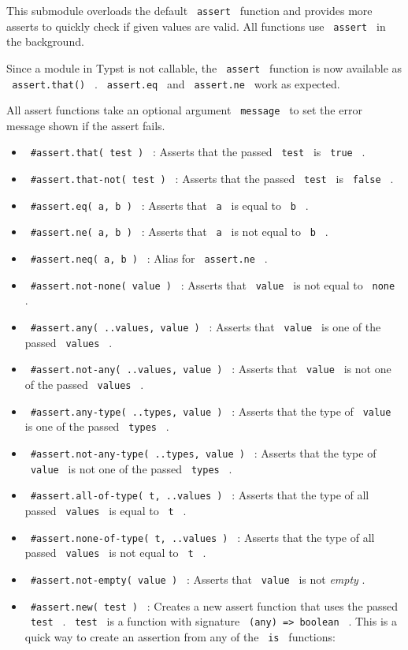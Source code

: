 This submodule overloads the default \texttt{\ assert\ } function and
provides more asserts to quickly check if given values are valid. All
functions use \texttt{\ assert\ } in the background.

Since a module in Typst is not callable, the \texttt{\ assert\ }
function is now available as \texttt{\ assert.that()\ } .
\texttt{\ assert.eq\ } and \texttt{\ assert.ne\ } work as expected.

All assert functions take an optional argument \texttt{\ message\ } to
set the error message shown if the assert fails.

\begin{itemize}
\item
  \texttt{\ \#assert.that(\ test\ )\ } : Asserts that the passed
  \texttt{\ test\ } is \texttt{\ true\ } .
\item
  \texttt{\ \#assert.that-not(\ test\ )\ } : Asserts that the passed
  \texttt{\ test\ } is \texttt{\ false\ } .
\item
  \texttt{\ \#assert.eq(\ a,\ b\ )\ } : Asserts that \texttt{\ a\ } is
  equal to \texttt{\ b\ } .
\item
  \texttt{\ \#assert.ne(\ a,\ b\ )\ } : Asserts that \texttt{\ a\ } is
  not equal to \texttt{\ b\ } .
\item
  \texttt{\ \#assert.neq(\ a,\ b\ )\ } : Alias for
  \texttt{\ assert.ne\ } .
\item
  \texttt{\ \#assert.not-none(\ value\ )\ } : Asserts that
  \texttt{\ value\ } is not equal to \texttt{\ none\ } .
\item
  \texttt{\ \#assert.any(\ ..values,\ value\ )\ } : Asserts that
  \texttt{\ value\ } is one of the passed \texttt{\ values\ } .
\item
  \texttt{\ \#assert.not-any(\ ..values,\ value\ )\ } : Asserts that
  \texttt{\ value\ } is not one of the passed \texttt{\ values\ } .
\item
  \texttt{\ \#assert.any-type(\ ..types,\ value\ )\ } : Asserts that the
  type of \texttt{\ value\ } is one of the passed \texttt{\ types\ } .
\item
  \texttt{\ \#assert.not-any-type(\ ..types,\ value\ )\ } : Asserts that
  the type of \texttt{\ value\ } is not one of the passed
  \texttt{\ types\ } .
\item
  \texttt{\ \#assert.all-of-type(\ t,\ ..values\ )\ } : Asserts that the
  type of all passed \texttt{\ values\ } is equal to \texttt{\ t\ } .
\item
  \texttt{\ \#assert.none-of-type(\ t,\ ..values\ )\ } : Asserts that
  the type of all passed \texttt{\ values\ } is not equal to
  \texttt{\ t\ } .
\item
  \texttt{\ \#assert.not-empty(\ value\ )\ } : Asserts that
  \texttt{\ value\ } is not \emph{empty} .
\item
  \texttt{\ \#assert.new(\ test\ )\ } : Creates a new assert function
  that uses the passed \texttt{\ test\ } . \texttt{\ test\ } is a
  function with signature \texttt{\ (any)\ =\textgreater{}\ boolean\ } .
  This is a quick way to create an assertion from any of the
  \texttt{\ is\ } functions:


\end{itemize}
